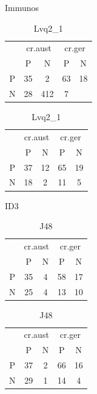 \begin{table}[p]
    \parbox{.45\linewidth}{
        \centering
        \caption{Immunos}
        \begin{tabular}{c|c c|c c}
            \multicolumn{1}{c}{}  & \multicolumn{2}{c}{cr.aust} & \multicolumn{2}{c}{cr.ger} \\
            \multirow{1}{2.5mm}{} & P & N & P & N \\
            \hline
            P & 35 & 2& 63 & 18 \\
            N & 28 & 412 &  7 \\
        \end{tabular}
    }
    \hfill
    \parbox{.45\linewidth}{
        \centering
        \caption{Lvq2\_1}
        \begin{tabular}{c|c c|c c}
            \multicolumn{1}{c}{}  & \multicolumn{2}{c}{cr.aust} & \multicolumn{2}{c}{cr.ger} \\
            \multirow{1}{2.5mm}{} & P & N & P & N \\
            \hline
            P & 37 & 12 & 65 & 19 \\
            N & 18 &  2 & 11 &  5 \\
        \end{tabular}
    }
\end{table}

\begin{table}[p]
    \parbox{.45\linewidth}{
        \centering
        \caption{ID3}
        \begin{tabular}{c|c c|c c}
            \multicolumn{1}{c}{}  & \multicolumn{2}{c}{cr.aust} & \multicolumn{2}{c}{cr.ger} \\
            \multirow{1}{2.5mm}{} & P & N & P & N \\
            \hline
            P & 35 & 4 & 58 & 17 \\
            N & 25 & 4 & 13 & 10 \\
        \end{tabular}
    }
    \hfill
    \parbox{.45\linewidth}{
        \centering
        \caption{J48}
        \begin{tabular}{c|c c|c c}
            \multicolumn{1}{c}{}  & \multicolumn{2}{c}{cr.aust} & \multicolumn{2}{c}{cr.ger} \\
            \multirow{1}{2.5mm}{} & P & N & P & N \\
            \hline
            P & 37 & 2 & 66 & 16 \\
            N & 29 & 1 & 14 &  4 \\
        \end{tabular}
    }
\end{table}

